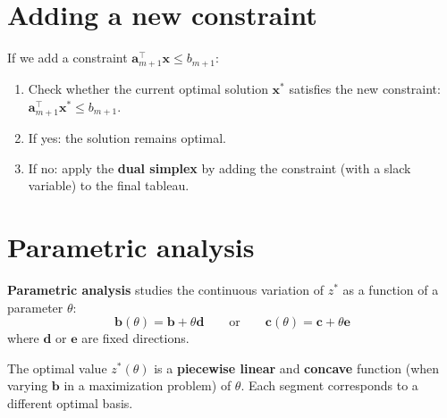 \section{Adding a new constraint}

If we add a constraint $\mathbf{a}_{m+1}^\top \mathbf{x} \le b_{m+1}$:
\begin{enumerate}
  \item Check whether the current optimal solution $\mathbf{x}^*$ satisfies
        the new constraint: $\mathbf{a}_{m+1}^\top \mathbf{x}^* \le b_{m+1}$.
  \item If yes: the solution remains optimal.
  \item If no: apply the \textbf{dual simplex} by adding the constraint
        (with a slack variable) to the final tableau.
\end{enumerate}

\section{Parametric analysis}

\begin{definition}
\textbf{Parametric analysis} studies the continuous variation of $z^*$ as a
function of a parameter $\theta$:
\[
  \mathbf{b}(\theta) = \mathbf{b} + \theta \mathbf{d}
  \qquad \text{or} \qquad
  \mathbf{c}(\theta) = \mathbf{c} + \theta \mathbf{e}
\]
where $\mathbf{d}$ or $\mathbf{e}$ are fixed directions.
\end{definition}

\begin{theorem}
The optimal value $z^*(\theta)$ is a \textbf{piecewise linear} and
\textbf{concave} function (when varying $\mathbf{b}$ in a maximization
problem) of $\theta$.  Each segment corresponds to a different optimal basis.
\end{theorem}

\begin{center}
\end{center}

